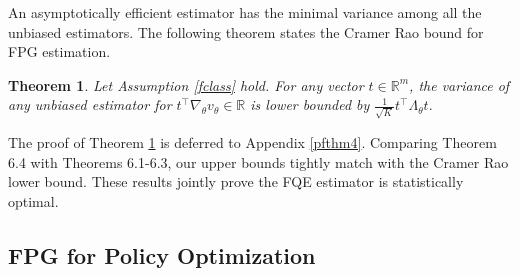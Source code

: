 \documentclass{article}
\newtheorem{theorem}{Theorem}[section]
\numberwithin{equation}{section}
\begin{document}
An asymptotically efficient estimator has the minimal variance among all the unbiased estimators. The following theorem states the Cramer Rao bound for FPG estimation. 
\begin{theorem}
\label{thm4}
Let Assumption \ref{fclass} hold. For any vector $t\in\mathbb{R}^m$, the variance of any unbiased estimator for $t^{\top}\nabla_{\theta}v_{\theta}  \in \mathbb{R}$ is lower bounded by $\frac{1}{\sqrt{K}}t^{\top} \Lambda_{\theta} t.$
\end{theorem}
The proof of Theorem \ref{thm4} is deferred to Appendix \ref{pfthm4}. Comparing Theorem 6.4 with Theorems 6.1-6.3, our upper bounds tightly match with the Cramer Rao lower bound. These results jointly prove the FQE estimator is statistically optimal.

\subsection{FPG for Policy Optimization}
\end{document}
